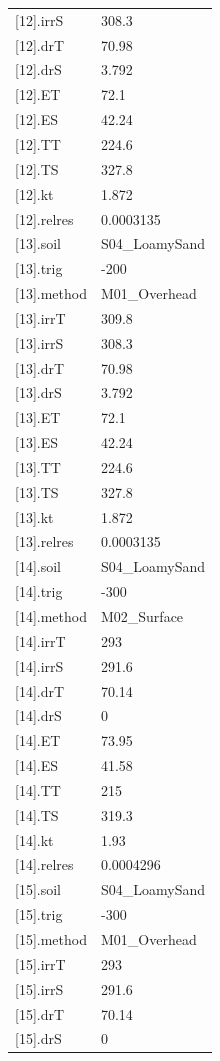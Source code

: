 {\begin{longtable}{p{}p{}}
{}[12].irrS & 308.3\\
{}[12].drT & 70.98\\
{}[12].drS & 3.792\\
{}[12].ET & 72.1\\
{}[12].ES & 42.24\\
{}[12].TT & 224.6\\
{}[12].TS & 327.8\\
{}[12].kt & 1.872\\
{}[12].relres & 0.0003135\\
{}[13].soil & S04\_LoamySand\\
{}[13].trig & -200\\
{}[13].method & M01\_Overhead\\
{}[13].irrT & 309.8\\
{}[13].irrS & 308.3\\
{}[13].drT & 70.98\\
{}[13].drS & 3.792\\
{}[13].ET & 72.1\\
{}[13].ES & 42.24\\
{}[13].TT & 224.6\\
{}[13].TS & 327.8\\
{}[13].kt & 1.872\\
{}[13].relres & 0.0003135\\
{}[14].soil & S04\_LoamySand\\
{}[14].trig & -300\\
{}[14].method & M02\_Surface\\
{}[14].irrT & 293\\
{}[14].irrS & 291.6\\
{}[14].drT & 70.14\\
{}[14].drS & 0\\
{}[14].ET & 73.95\\
{}[14].ES & 41.58\\
{}[14].TT & 215\\
{}[14].TS & 319.3\\
{}[14].kt & 1.93\\
{}[14].relres & 0.0004296\\
{}[15].soil & S04\_LoamySand\\
{}[15].trig & -300\\
{}[15].method & M01\_Overhead\\
{}[15].irrT & 293\\
{}[15].irrS & 291.6\\
{}[15].drT & 70.14\\
{}[15].drS & 0\\

\end{longtable}}
